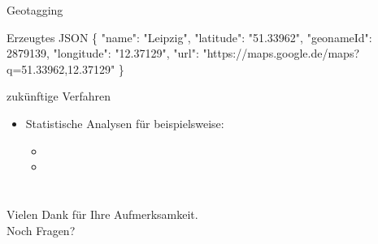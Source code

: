 \documentclass[12pt]{beamer}
\begin{document}
\begin{large}
\begin{frame}{Geotagging}
 \begin{block}{Erzeugtes JSON}
 \normalsize 
\{ \hspace*{0.17cm}"{}name"{}: "{}Leipzig"{},
 \newline
 \hspace*{0.5cm}"{}latitude"{}: "{}51.33962"{},
 \newline
 \hspace*{0.5cm}"{}geonameId"{}: 2879139,
 \newline
 \hspace*{0.5cm}"{}longitude"{}: "{}12.37129"{},
 \newline
 \hspace*{0.5cm}"{}url"{}: 
 \hspace*{0.5cm}"{}https://maps.google.de/maps?q=51.33962,12.37129"{}
 \hspace*{0.17cm}\}
 \end{block}
\end{frame}
 

\begin{frame}{zukünftige Verfahren}
 \begin{itemize}
   \item Statistische Analysen für beispielsweise:
   \begin{itemize}
    \item
    \item 
   \end{itemize}
 \end{itemize}
\end{frame}


\section*{}
\begin{frame}
\centering
{\Large Vielen Dank für Ihre Aufmerksamkeit. \\ Noch Fragen?}
\end{frame}

\end{large}
\end{document}
